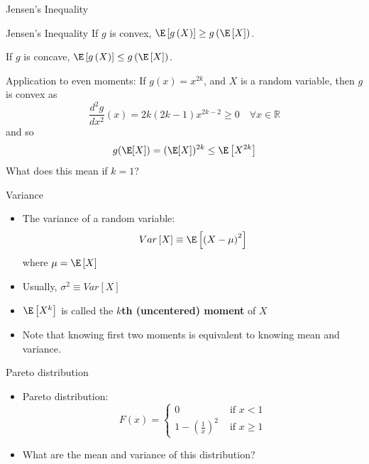 \documentclass[aspectratio=169,11pt]{beamer}
\begin{document}
\begin{frame}{Jensen's Inequality}
\begin{center}
\begin{minipage}{.8\textwidth}
\begin{block}{Jensen's Inequality}
If $g$ is convex, $\E\left[g\left(X\right)\right] \ge g\left(\E\left[X\right]\right)$.

\medskip
If $g$ is concave, $\E\left[g\left(X\right)\right] \le g\left(\E\left[X\right]\right)$.
\end{block}
\end{minipage}
\end{center}
\vspace{0.2cm}
\pause
Application to even moments:
If $g(x)=x^{2 k}$, and $X$ is a random variable, then $g$ is convex as
$$
\frac{d^2 g}{d x^2}(x)=2 k(2 k-1) x^{2 k-2} \geq 0 \quad \forall x \in \mathbb{R}
$$
and so
$$
g(\E[X])=(\E[X])^{2 k} \leq \E\left[X^{2 k}\right]
$$
What does this mean if $k=1$?
\end{frame}


\begin{frame}{Variance}
\begin{itemize}
	\item The variance of a random variable:\[
		Var \left[X\right] \equiv \E\left[\left(X-\mu\right)^2\right]
	\]
	where $\mu=\E\left[X\right]$
	
	\bigskip
	\item Usually, $\sigma^2 \equiv Var \left[X\right] $


	\bigskip
	\item $\E\left[X^k\right]$ is called the {\bf $k$th (uncentered) moment} of $X$
	
	\bigskip
	\item Note that knowing first two moments is equivalent to knowing mean and variance. 
	
\end{itemize}
\end{frame}


\begin{frame}{Pareto distribution}
\begin{itemize}
	\item Pareto distribution:\[
	F\left(x\right)=\begin{cases}
	0 & \text{ if }x<1\\
	1-\left(\frac{1}{x}\right)^{2} & \text{ if }x\ge1
	\end{cases}
	\]

	\medskip
	\item What are the mean and variance of this distribution?
	
\end{itemize}
\end{frame}
\end{document}
